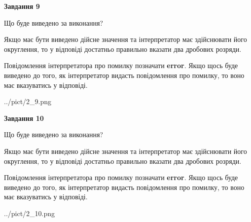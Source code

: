 \documentclass[12pt, ukrainian]{article}
\begin{document}
{\begin {Large}
{\begin {center}\textbf{Завдання 9}\end {center}}\par
Що буде виведено за виконання? \par

Якщо має бути виведено дійсне значення та інтерпретатор має здійснювати його округлення, 
то у відповіді достатньо правильно вказати два дробових розряди.

Повідомлення інтерпретатора про помилку позначати \textbf{error}.
Якщо щось буде виведено до того, як інтерпретатор видасть повідомлення про помилку, 
то воно має вказуватись у відповіді. \par

\begin{center}
	{../pict/2_9.png}
\end{center}
\newpage

{\begin {center}\textbf{Завдання 10}\end {center}}\par
Що буде виведено за виконання? \par

Якщо має бути виведено дійсне значення та інтерпретатор має здійснювати його округлення, 
то у відповіді достатньо правильно вказати два дробових розряди.

Повідомлення інтерпретатора про помилку позначати \textbf{error}.
Якщо щось буде виведено до того, як інтерпретатор видасть повідомлення про помилку, 
то воно має вказуватись у відповіді. \par

\begin{center}
	{../pict/2_10.png}
\end{center}
\newpage

\end {Large}}
\end{document}
